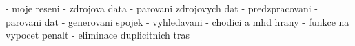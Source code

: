 
- moje reseni
  - zdrojova data
  - parovani zdrojovych dat
  - predzpracovani
    - parovani dat
    - generovani spojek
  - vyhledavani
    - chodici a mhd hrany
    - funkce na vypocet penalt
    - eliminace duplicitnich tras
